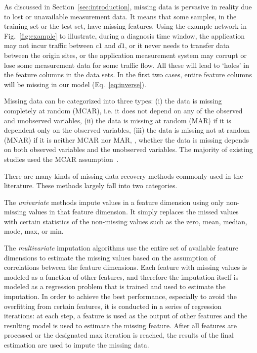 As discussed in Section~\ref{sec:introduction}, missing data is pervasive in reality due to lost or unavailable measurement data. 
It means that some samples, in the training set or the test set, have missing features. 
Using the example network in Fig.~\ref{fig:example} to illustrate, during a diagnosis time window, the application may not incur traffic between 
$c1$ and $d1$, or it never needs to transfer data between the origin sites, or the application measurement system may corrupt or lose some 
measurement data for some traffic flow. All these will lead to `holes' in the feature columns in the data sets. In the first two cases, 
entire feature columns will be missing in our model (Eq.~\ref{eq:inverse}).

Missing data can be categorized into three types: (i) the data is missing completely at random (MCAR), i.e. it does not depend on any of the observed and unobserved variables, (ii) the data is missing at random (MAR) if it is dependent only on the observed variables, (iii) the data is missing not at random (MNAR) if it is neither MCAR nor MAR, \ie, whether the data is missing depends on both observed variables and the unobserved variables. The majority of existing studies used the MCAR assumption~\cite{Yoon2018GAINMD}. 

There are many kinds of missing data recovery methods commonly used in the literature. These methods largely fall into two categories.

The {\it univariate} methods impute values in a  feature dimension using only non-missing values in that feature dimension. It simply replaces the missed 
values with certain statistics of the non-missing values such as the zero, mean, median, mode, max, or min. 

The {\it multivariate} imputation algorithms use the entire set of available feature dimensions to estimate the missing values based on the assumption of correlations between the feature dimensions. Each feature with missing values is modeled as a function of other features, and therefore the imputation itself is modeled as a regression problem that is trained and used to estimate the imputation. In order to achieve the best performance, especially to avoid the 
overfitting from certain features, it is conducted in a series of regression iterations: at each step, a feature is used as the output of other features and the resulting model is used to estimate the missing feature. After all features are processed or the designated max iteration is reached, the results of the final estimation are used to impute 
the missing data.

